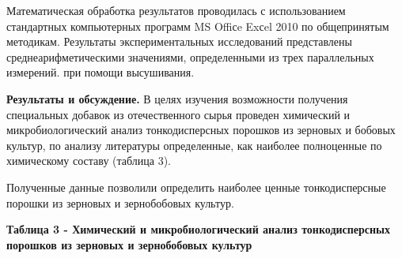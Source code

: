 Математическая обработка результатов проводилась с использованием
стандартных компьютерных программ MS Offiсe Exсel 2010 по общепринятым
методикам. Результаты экспериментальных исследований представлены
среднеарифметическими значениями, определенными из трех параллельных
измерений. при помощи высушивания.

{\bfseries Результаты и обсуждение.} В целях изучения возможности получения
специальных добавок из отечественного сырья проведен химический и
микробиологический анализ тонкодисперсных порошков из зерновых и бобовых
культур, по анализу литературы определенные, как наиболее полноценные по
химическому составу (таблица 3).

Полученные данные позволили определить наиболее ценные тонкодисперсные
порошки из зерновых и зернобобовых культур.

{\bfseries Таблица 3 - Химический и микробиологический анализ
тонкодисперсных порошков из зерновых и зернобобовых культур}

